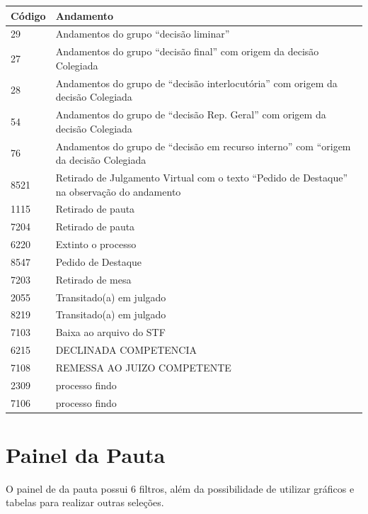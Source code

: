 \documentclass[
]{book}
\begin{document}
\begin{table}[H]
\centering\begingroup\fontsize{14}{16}\selectfont

\begin{tabular}{l|l}
\hline
Código & Andamento\\
\hline
29 & Andamentos do grupo “decisão liminar”\\
\hline
27 & Andamentos do grupo “decisão final” com origem da decisão Colegiada\\
\hline
28 & Andamentos do grupo de “decisão interlocutória” com origem da decisão Colegiada\\
\hline
54 & Andamentos do grupo de “decisão Rep. Geral” com origem da decisão Colegiada\\
\hline
76 & Andamentos do grupo de “decisão em recurso interno” com “origem da decisão Colegiada\\
\hline
8521 & Retirado de Julgamento Virtual com o texto “Pedido de Destaque” na observação do andamento\\
\hline
1115 & Retirado de pauta\\
\hline
7204 & Retirado de pauta\\
\hline
6220 & Extinto o processo\\
\hline
8547 & Pedido de Destaque\\
\hline
7203 & Retirado de mesa\\
\hline
2055 & Transitado(a) em julgado\\
\hline
8219 & Transitado(a) em julgado\\
\hline
7103 & Baixa ao arquivo do STF\\
\hline
6215 & DECLINADA COMPETENCIA\\
\hline
7108 & REMESSA AO JUIZO COMPETENTE\\
\hline
2309 & processo findo\\
\hline
7106 & processo findo\\
\hline
\end{tabular}
\endgroup{}
\end{table}

\hypertarget{painel-da-pauta}{%
\section{Painel da Pauta}\label{painel-da-pauta}}

O painel de da pauta possui 6 filtros, além da possibilidade de utilizar gráficos e tabelas para realizar outras seleções.
\end{document}

